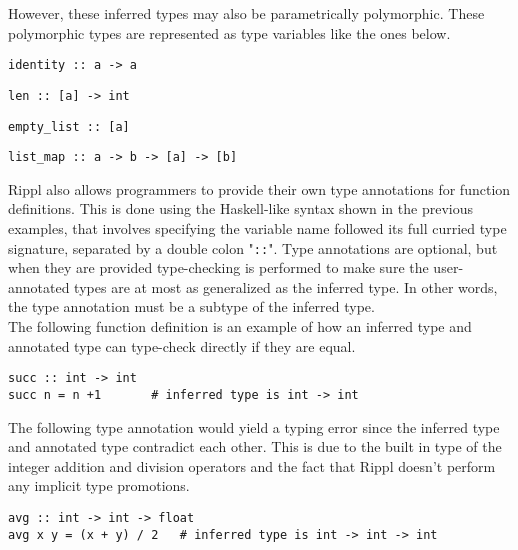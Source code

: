 \documentclass[5pt]{article}
\begin{document}
However, these inferred types may also be parametrically polymorphic. These polymorphic types are represented as type variables like the ones below. \\

\begin{lstlisting}[language=rippl]
identity :: a -> a
\end{lstlisting}
\begin{lstlisting}[language=rippl]
len :: [a] -> int
\end{lstlisting}
\begin{lstlisting}[language=rippl]
empty_list :: [a]
\end{lstlisting}
\begin{lstlisting}[language=rippl]
list_map :: a -> b -> [a] -> [b]
\end{lstlisting}

Rippl also allows programmers to provide their own type annotations for function definitions. This is done using the Haskell-like syntax shown in the previous examples, that involves specifying the variable name followed its full curried type signature, separated by a double colon "\texttt{::}". Type annotations are optional, but when they are provided type-checking is performed to make sure the user-annotated types are at most as generalized as the inferred type. In other words, the type annotation must be a subtype of the inferred type. \\

The following function definition is an example of how an inferred type and annotated type can type-check directly if they are equal. \\

\begin{lstlisting}[language=rippl]
succ :: int -> int
succ n = n +1       # inferred type is int -> int
\end{lstlisting}
\pagebreak

The following type annotation would yield a typing error since the inferred type and annotated type contradict each other. This is due to the built in type of the integer addition and division operators and the fact that Rippl doesn't perform any implicit type promotions. \\

\begin{lstlisting}[language=rippl]
avg :: int -> int -> float
avg x y = (x + y) / 2   # inferred type is int -> int -> int
\end{lstlisting}
\end{document}
